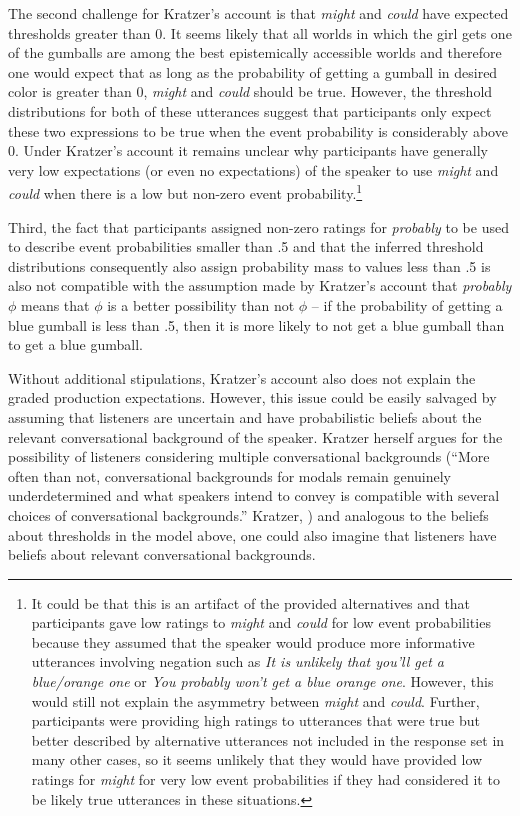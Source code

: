 The second challenge for Kratzer's account is that \textit{might} and \textit{could} have expected thresholds greater than 0.
It seems likely that all worlds in which the girl gets one of the gumballs are among the best epistemically accessible worlds 
and therefore one would expect that as long as the probability of getting a gumball in desired color is greater than 0, \textit{might} 
and \textit{could} should be true. However, the threshold distributions for both of these utterances suggest that participants only
expect these two expressions to be true when the event probability is considerably above 0. Under Kratzer's account it remains unclear
why participants have generally very low expectations (or even no expectations) of the speaker to use \textit{might} and \textit{could}
when there is a low but non-zero event probability.\footnote{It could be that this is an artifact of the provided alternatives and that participants gave
low ratings to \textit{might} and \textit{could} for low event probabilities because they assumed that the speaker would produce more informative utterances
involving negation such as \emph{It is unlikely that you'll get a blue/orange one} or \emph{You probably won't get a blue orange one}. However, this would still not explain
the asymmetry between \textit{might} and \textit{could}. Further, participants were providing high ratings to utterances that were true but better described by alternative utterances not included
in the response set in many other cases, so it seems unlikely that they would have provided low ratings for \textit{might} for very low event probabilities if they had considered 
it to be likely true utterances in these situations.}

Third, the fact that participants assigned non-zero ratings for \textit{probably} to be used to describe event probabilities smaller than .5 and that the
inferred threshold distributions consequently also assign probability mass to values less than .5 is also not compatible with the assumption made by 
Kratzer's account that \textit{probably} $\phi$ means that $\phi$ is a better possibility than not $\phi$ -- if the probability of getting a blue gumball is less than
.5, then it is more likely to not get a blue gumball than to get a blue gumball.

Without additional stipulations, Kratzer's account also does not explain the graded production expectations. However, this issue could be easily salvaged 
by assuming that listeners are uncertain and have probabilistic beliefs about the relevant conversational background of the speaker. Kratzer herself argues for the possibility
of listeners considering multiple conversational backgrounds (``More often than not, conversational backgrounds for modals remain genuinely underdetermined and what speakers intend to convey is compatible with several choices of conversational backgrounds.'' Kratzer, \citeyear[][Ch. 2, p. 32]{Kratzer2012}) and analogous to the beliefs about thresholds in the model above, one could also imagine that listeners have
beliefs about relevant conversational backgrounds.

